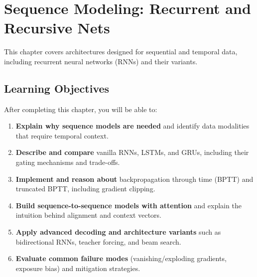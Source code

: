 
\chapter{Sequence Modeling: Recurrent and Recursive Nets}
\label{chap:sequence-modeling}

This chapter covers architectures designed for sequential and temporal data, including recurrent neural networks (RNNs) and their variants.


\section*{Learning Objectives}
\label{sec:ch10-learning-objectives}

After completing this chapter, you will be able to:

\begin{enumerate}
    \item \textbf{Explain why sequence models are needed} and identify data modalities that require temporal context.
    \item \textbf{Describe and compare} vanilla RNNs, LSTMs, and GRUs, including their gating mechanisms and trade-offs.
    \item \textbf{Implement and reason about} backpropagation through time (BPTT) and truncated BPTT, including gradient clipping.
    \item \textbf{Build sequence-to-sequence models with attention} and explain the intuition behind alignment and context vectors.
    \item \textbf{Apply advanced decoding and architecture variants} such as bidirectional RNNs, teacher forcing, and beam search.
    \item \textbf{Evaluate common failure modes} (vanishing/exploding gradients, exposure bias) and mitigation strategies.
\end{enumerate}















